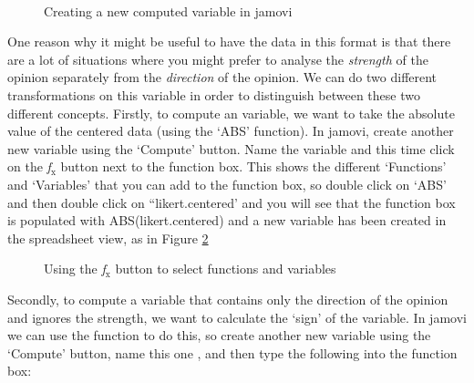  \\

\begin{figure}[h!!]
\begin{center}
\caption{Creating a new computed variable in jamovi}
\label{fig:likertraw}
\HR
\end{center}
\end{figure}

One reason why it might be useful to have the data in this format is that there are a lot of situations where you might prefer to analyse the {\it strength} of the opinion separately from the {\it direction} of the opinion. We can do two different transformations on this  variable in order to distinguish between these two different concepts. Firstly, to compute an  variable, we want to take the absolute value of the centered data (using the `ABS' function). In jamovi, create another new variable using the `Compute' button. Name the variable  and this time click on the {\it f$_{\text{x}}$} button next to the function box. This shows the different `Functions' and `Variables' that you can add to the function box, so double click on `ABS' and then double click on ``likert.centered' and you will see that the function box is populated with ABS(likert.centered) and a new variable has been created in the spreadsheet view, as in Figure \ref{fig:opinionstrength}

\begin{figure}[h!!]
\begin{center}
\caption{Using the {\it f$_{\text{x}}$} button to select functions and variables}
\label{fig:opinionstrength}
\HR
\end{center}
\end{figure}


Secondly, to compute a variable that contains only the direction of the opinion and ignores the strength, we want to calculate the `sign' of the variable. In jamovi we can use the  function to do this, so create another new variable using the `Compute' button, name this one , and then type the following into the function box: \\


 \\


